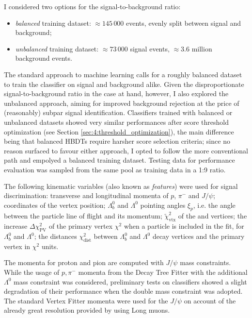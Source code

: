 I considered two options for the signal-to-background ratio:
\begin{itemize}
	\item \textit{balanced} training dataset: $\approx 145\,000$ events, evenly split between signal and background;
	\item \textit{unbalanced} training dataset: $\approx 73\,000$ signal events, $\approx 3.6$ million background events.
\end{itemize}
The standard approach to machine learning calls for a roughly balanced dataset to train the classifier on signal and background alike.
Given the disproportionate signal-to-background ratio in the case at hand, however, I also explored the unbalanced approach, aiming for improved background rejection at the price of (reasonably) subpar signal identification.
Classifiers trained with balanced or unbalanced datasets showed very similar performances after score threshold optimization (see Section \ref{sec:4:threshold_optimization}), the main difference being that balanced HBDTs require harsher score selection criteria;
since no reason surfaced to favour either approach, I opted to follow the more conventional path and empolyed a balanced training dataset.
Testing data for performance evaluation was sampled from the same pool as training data in a 1:9 ratio.

The following kinematic variables (also known as \textit{features}) were used for signal discrimination:
transverse and longitudinal momenta of $p$, $\pi^-$ and $J/\psi$;
coordinates of the \lambdadecay vertex position;
$\Lambda_b^0$ and $\Lambda^0$  pointing angles $\xi_p$, i.e. the angle between the particle line of flight and its momentum;
$\tilde{\chi}^2_\text{vtx}$ of the \demonstratorshort and \lambdadecay vertices;
the increase $\Delta \chi^2_\text{PV}$ of the primary vertex $\chi^2$ when a particle is included in the fit, for $\Lambda_b^0$ and $\Lambda^0$;
the distances $\chi^2_\text{dist}$ between $\Lambda_b^0$ and $\Lambda^0$ decay vertices and the primary vertex in $\chi^2$ units.

The momenta for proton and pion are computed with $J/\psi$ mass constraints.
While the usage of $p,\pi^-$ momenta from the Decay Tree Fitter with the additional $\Lambda^0$ mass constraint was considered, preliminary tests on classifiers showed a slight degradation of their performance when the double mass constraint was adopted.
The standard Vertex Fitter momenta were used for the $J/\psi$ on account of the already great resolution provided by using Long muons.

